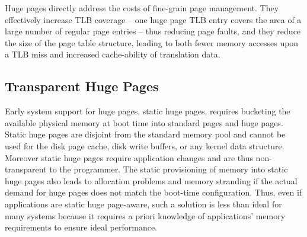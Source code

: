 Huge pages directly address the costs of fine-grain page management.
They effectively increase TLB coverage -- one huge page TLB entry covers the area
of a large number of regular page entries -- thus reducing page faults, and they
reduce the size of the page table structure, leading to both fewer memory
accesses upon a TLB miss and increased cache-ability of translation data.
%
%

\subsection{Transparent Huge Pages} \label{sec:thp_bg}
Early system support for huge pages, static huge pages, requires bucketing the
available physical memory at boot time into standard pages and huge pages.
Static huge pages are disjoint from the standard memory pool and cannot be used
for the disk page cache, disk write buffers, or any kernel data structure.
Moreover static huge pages require application changes and are thus
non-transparent to the programmer. The static provisioning of memory into static
huge pages also leads to allocation problems and memory stranding if the actual
demand for huge pages does not match the boot-time configuration.  Thus, even if
applications are static huge page-aware, such a solution is less than ideal for
many systems because it requires a priori knowledge of applications' memory
requirements to ensure ideal performance.

